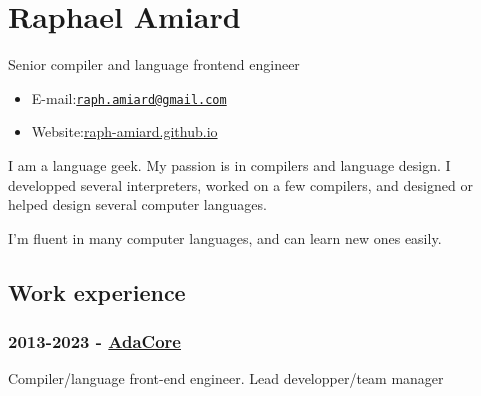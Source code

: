 \documentclass[10pt,letterpaper]{article}
\def\name{}
\providecommand{\tightlist}{%
  \setlength{\itemsep}{0pt}\setlength{\parskip}{0pt}}
\begin{document}
{\huge \name}

\bigskip


\hypertarget{raphael-amiard}{%
\section{Raphael Amiard}\label{raphael-amiard}}

Senior compiler and language frontend engineer

\begin{itemize}
\tightlist
\item
  E-mail:\href{mailto:raph.amiard@gmail.com}{\nolinkurl{raph.amiard@gmail.com}}
\item
  Website:\href{https://raph-amiard.github.io}{raph-amiard.github.io}
\end{itemize}

I am a language geek. My passion is in compilers and language design. I
developped several interpreters, worked on a few compilers, and designed
or helped design several computer languages.

I'm fluent in many computer languages, and can learn new ones easily.

\hypertarget{work-experience}{%
\subsection{Work experience}\label{work-experience}}

\hypertarget{adacore}{%
\subsubsection{\texorpdfstring{\textbf{2013-2023} -
\href{https://www.adacore.com/}{AdaCore}}{2013-2023 - AdaCore}}\label{adacore}}

Compiler/language front-end engineer. Lead developper/team manager
\end{document}
